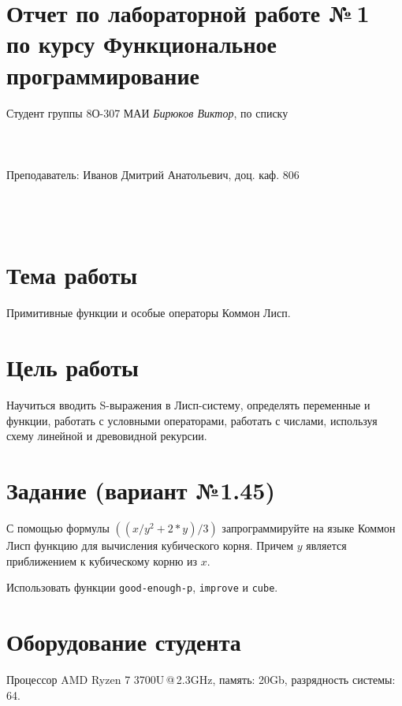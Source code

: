 \documentclass[12pt]{article}
\begin{document}
\section*{Отчет по лабораторной работе №\,1 \\
по курсу \guillemotleft  Функциональное программирование\guillemotright}
\begin{flushright}
Студент группы 8О-307 МАИ \textit{Бирюков Виктор},  по списку \\
 \\
 \\
\ \\
Преподаватель: Иванов Дмитрий Анатольевич, доц. каф. 806 \\
 \\
 \\
 \\

\end{flushright}

\section{Тема работы}
Примитивные функции и особые операторы Коммон Лисп.

\section{Цель работы}
Научиться вводить S-выражения в Лисп-систему, определять переменные и функции, работать с условными операторами, работать с числами, используя схему линейной и древовидной рекурсии.

\section{Задание (вариант №1.45)}
С помощью формулы $((x / y^2 + 2*y) / 3)$ запрограммируйте на языке Коммон Лисп функцию для вычисления кубического корня. Причем $y$ является приближением к кубическому корню из $x$.

Использовать функции {\tt good-enough-p}, {\tt improve} и {\tt cube}.

\section{Оборудование студента}
Процессор AMD Ryzen 7 3700U\,@\,2.3GHz, память: 20Gb, разрядность системы: 64.
\end{document}
